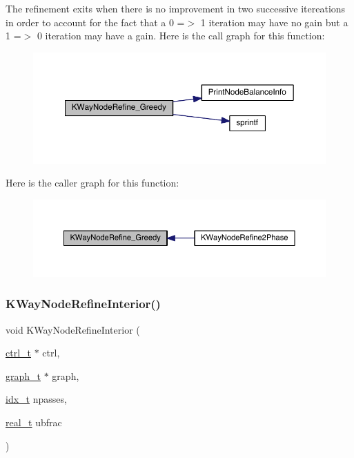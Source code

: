 The refinement exits when there is no improvement in two successive itereations in order to account for the fact that a 0 =$>$ 1 iteration may have no gain but a 1 =$>$ 0 iteration may have a gain. Here is the call graph for this function\+:\nopagebreak
\begin{figure}[H]
\begin{center}
\leavevmode
\includegraphics[width=350pt]{a00383_a5c9aaeced318b88b4ad50dcb484d47b1_cgraph}
\end{center}
\end{figure}
Here is the caller graph for this function\+:\nopagebreak
\begin{figure}[H]
\begin{center}
\leavevmode
\includegraphics[width=350pt]{a00383_a5c9aaeced318b88b4ad50dcb484d47b1_icgraph}
\end{center}
\end{figure}
\mbox{\label{a00383_ad38351510bbf07393425b90ea3c4f5bd}} 
\subsubsection{\texorpdfstring{K\+Way\+Node\+Refine\+Interior()}{KWayNodeRefineInterior()}}
{\footnotesize\ttfamily void K\+Way\+Node\+Refine\+Interior (\begin{DoxyParamCaption}\item[{\hyperlink{a00742}{ctrl\+\_\+t} $\ast$}]{ctrl,  }\item[{\hyperlink{a00734}{graph\+\_\+t} $\ast$}]{graph,  }\item[{\hyperlink{a00876_aaa5262be3e700770163401acb0150f52}{idx\+\_\+t}}]{npasses,  }\item[{\hyperlink{a00876_a1924a4f6907cc3833213aba1f07fcbe9}{real\+\_\+t}}]{ubfrac }\end{DoxyParamCaption})}

